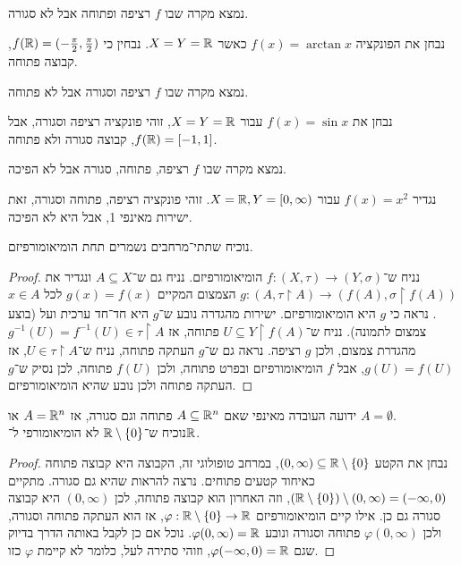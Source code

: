 \subquestion{}
נמצא מקרה שבו $f$ רציפה ופתוחה אבל לא סגורה.
\begin{solution}
	נבחן את הפונקציה $f(x) = \arctan x$ כאשר $X = Y = \mathbb{R}$.
	נבחין כי $f(\mathbb{R}) = (-\frac{\pi}{2}, \frac{\pi}{2})$, קבוצה פתוחה.
\end{solution}

\subquestion{}
נמצא מקרה שבו $f$ רציפה וסגורה אבל לא פתוחה.
\begin{solution}
	נבחן את $f(x) = \sin x$ עבור $X = Y = \mathbb{R}$, זוהי פונקציה רציפה וסגורה, אבל $f(\mathbb{R}) = [-1, 1]$, קבוצה סגורה ולא פתוחה.
\end{solution}

\subquestion{}
נמצא מקרה שבו $f$ רציפה, פתוחה, סגורה אבל לא הפיכה.
\begin{solution}
	נגדיר $f(x) = x^2$ עבור $X = \mathbb{R}, Y = [0, \infty)$.
	זוהי פונקציה רציפה, פתוחה וסגורה, זאת ישירות מאינפי 1, אבל היא לא הפיכה.
\end{solution}

\question{}
נוכיח שתתי־מרחבים נשמרים תחת הומיאומורפיזם.
\begin{proof}
	נניח ש־$f : (X, \tau) \to (Y, \sigma)$ הומיאומורפיזם.
	נניח גם ש־$A \subseteq X$ ונגדיר את $g : (A, \tau \restriction A) \to (f(A), \sigma \restriction f(A))$ הצמצום המקיים $g(x) = f(x)$ לכל $x \in A$.
	נראה כי $g$ היא הומיאומורפיזם.
	ישירות מהגדרה נובע ש־$g$ היא חד־חד ערכית ועל (בוצע צמצום לתמונה).
	נניח ש־$U \subseteq Y \restriction f(A)$ פתוחה, אז $g^{-1}(U) = f^{-1}(U) \in \tau \restriction A$ מהגדרת צמצום, ולכן $g$ רציפה.
	נראה גם ש־$g$ העתקה פתוחה, נניח ש־$U \in \tau \restriction A$, אז $g(U) = f(U)$, אבל $f$ הומיאומורפיזם ובפרט פתוחה, ולכן $f(U)$ פתוחה, לכן נסיק ש־$g$ העתקה פתוחה ולכן נובע שהיא הומיאומורפיזם.
\end{proof}

\question{}
\subquestion{}
ידועה העובדה מאינפי שאם $A \subseteq \mathbb{R}^n$ פתוחה וגם סגורה, אז $A = \mathbb{R}^n$ או $A = \emptyset$. \\
נוכיח ש־$\mathbb{R} \setminus \{ 0 \}$ לא הומיאומורפי ל־$\mathbb{R}$.
\begin{proof}
	נבחן את הקטע $(0, \infty) \subseteq \mathbb{R} \setminus \{ 0 \}$, במרחב טופולוגי זה, הקבוצה היא קבוצה פתוחה כאיחוד קטעים פתוחים.
	נרצה להראות שהיא גם סגורה.
	מתקיים $(\mathbb{R} \setminus \{ 0 \}) \setminus (0, \infty) = (-\infty, 0)$, וזה האחרון הוא קבוצה פתוחה, לכן $(0, \infty)$ היא קבוצה סגורה גם כן.
	אילו קיים הומיאומורפיזם $\varphi : \mathbb{R} \setminus \{ 0 \} \to \mathbb{R}$, אז הוא העתקה פתוחה וסגורה, ולכן $\varphi(0, \infty)$ פתוחה וסגורה ונובע $\varphi(0, \infty) = \mathbb{R}$.
	נוכל אם כן לקבל באותה הדרך בדיוק שגם $\varphi(-\infty, 0) = \mathbb{R}$, וזוהי סתירה לעל, כלומר לא קיימת $\varphi$ כזו.
\end{proof}

